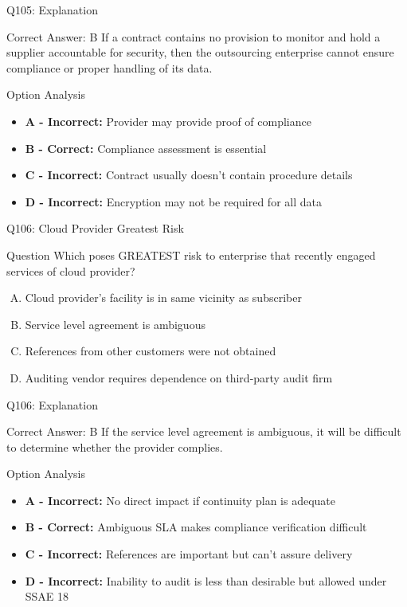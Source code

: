 \documentclass{beamer}
\begin{document}
	\begin{frame}{Q105: Explanation}
		\begin{block}{Correct Answer: B}
			If a contract contains no provision to monitor and hold a supplier accountable for security, then the outsourcing enterprise cannot ensure compliance or proper handling of its data.
		\end{block}
		\begin{block}{Option Analysis}
			\begin{itemize}
				\item \textbf{A - Incorrect:} Provider may provide proof of compliance
				\item \textbf{B - Correct:} Compliance assessment is essential
				\item \textbf{C - Incorrect:} Contract usually doesn't contain procedure details
				\item \textbf{D - Incorrect:} Encryption may not be required for all data
			\end{itemize}
		\end{block}
	\end{frame}
	
	\begin{frame}{Q106: Cloud Provider Greatest Risk}
		\begin{block}{Question}
			Which poses GREATEST risk to enterprise that recently engaged services of cloud provider?
		\end{block}
		\begin{enumerate}[(A)]
			\item Cloud provider's facility is in same vicinity as subscriber
			\item Service level agreement is ambiguous
			\item References from other customers were not obtained
			\item Auditing vendor requires dependence on third-party audit firm
		\end{enumerate}
	\end{frame}
	
	\begin{frame}{Q106: Explanation}
		\begin{block}{Correct Answer: B}
			If the service level agreement is ambiguous, it will be difficult to determine whether the provider complies.
		\end{block}
		\begin{block}{Option Analysis}
			\begin{itemize}
				\item \textbf{A - Incorrect:} No direct impact if continuity plan is adequate
				\item \textbf{B - Correct:} Ambiguous SLA makes compliance verification difficult
				\item \textbf{C - Incorrect:} References are important but can't assure delivery
				\item \textbf{D - Incorrect:} Inability to audit is less than desirable but allowed under SSAE 18
			\end{itemize}
		\end{block}
	\end{frame}
	
\end{document}
